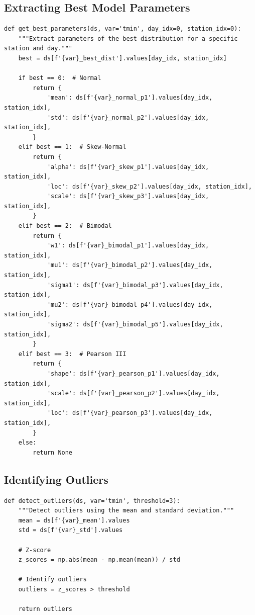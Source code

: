 ﻿\documentclass[12pt,a4paper]{report}
\begin{document}
\subsection{Extracting Best Model Parameters}
\begin{lstlisting}[caption=Extracting Best Model Parameters]
def get_best_parameters(ds, var='tmin', day_idx=0, station_idx=0):
    """Extract parameters of the best distribution for a specific station and day."""
    best = ds[f'{var}_best_dist'].values[day_idx, station_idx]

    if best == 0:  # Normal
        return {
            'mean': ds[f'{var}_normal_p1'].values[day_idx, station_idx],
            'std': ds[f'{var}_normal_p2'].values[day_idx, station_idx],
        }
    elif best == 1:  # Skew-Normal
        return {
            'alpha': ds[f'{var}_skew_p1'].values[day_idx, station_idx],
            'loc': ds[f'{var}_skew_p2'].values[day_idx, station_idx],
            'scale': ds[f'{var}_skew_p3'].values[day_idx, station_idx],
        }
    elif best == 2:  # Bimodal
        return {
            'w1': ds[f'{var}_bimodal_p1'].values[day_idx, station_idx],
            'mu1': ds[f'{var}_bimodal_p2'].values[day_idx, station_idx],
            'sigma1': ds[f'{var}_bimodal_p3'].values[day_idx, station_idx],
            'mu2': ds[f'{var}_bimodal_p4'].values[day_idx, station_idx],
            'sigma2': ds[f'{var}_bimodal_p5'].values[day_idx, station_idx],
        }
    elif best == 3:  # Pearson III
        return {
            'shape': ds[f'{var}_pearson_p1'].values[day_idx, station_idx],
            'scale': ds[f'{var}_pearson_p2'].values[day_idx, station_idx],
            'loc': ds[f'{var}_pearson_p3'].values[day_idx, station_idx],
        }
    else:
        return None
\end{lstlisting}

\subsection{Identifying Outliers}
\begin{lstlisting}[caption=Identifying Outliers]
def detect_outliers(ds, var='tmin', threshold=3):
    """Detect outliers using the mean and standard deviation."""
    mean = ds[f'{var}_mean'].values
    std = ds[f'{var}_std'].values

    # Z-score
    z_scores = np.abs(mean - np.mean(mean)) / std

    # Identify outliers
    outliers = z_scores > threshold

    return outliers
\end{lstlisting}
\end{document}
